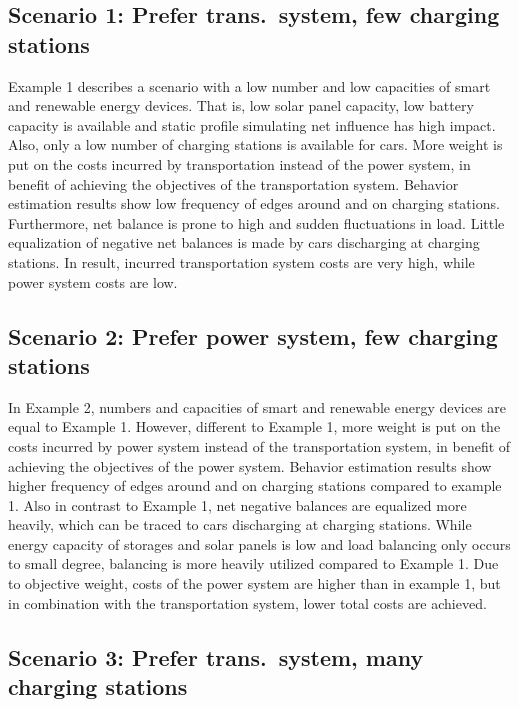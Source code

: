 \subsection*{Scenario 1: Prefer trans.\ system, few charging stations}
Example 1 describes a scenario with a low number and low capacities of smart and renewable energy devices. That is, low solar panel capacity, low battery capacity is available and static profile simulating net influence has high impact. Also, only a low number of charging stations is available for cars. More weight is put on the costs incurred by transportation instead of the power system, in benefit of achieving the objectives of the transportation system. Behavior estimation results show low frequency of edges around and on charging stations. Furthermore, net balance is prone to high and sudden fluctuations in load. Little equalization of negative net balances is made by cars discharging at charging stations. In result, incurred transportation system costs are very high, while power system costs are low.

\subsection*{Scenario 2: Prefer power system, few charging stations}

In Example 2, numbers and capacities of smart and renewable energy devices are equal to Example 1. However, different to Example 1, more weight is put on the costs incurred by power system instead of the transportation system, in benefit of achieving the objectives of the power system. Behavior estimation results show higher frequency of edges around and on charging stations compared to example 1. Also in contrast to Example 1, net negative balances are equalized more heavily, which can be traced to cars discharging at charging stations. While energy capacity of storages and solar panels is low and load balancing only occurs to small degree, balancing is more heavily utilized compared to Example 1. Due to objective weight, costs of the power system are higher than in example 1, but in combination with the transportation system, lower total costs are achieved.

\subsection*{Scenario 3: Prefer trans.\ system, many charging stations}

